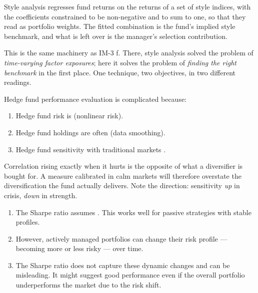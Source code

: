 Style analysis regresses fund returns on the returns of a set of 
style indices, with the coefficients constrained to be non-negative and to sum to
one, so that they read as portfolio weights. The fitted combination is the fund's
implied style benchmark, and what is left over is the manager's selection
contribution.

\begin{imkeybox}
This is the same machinery as IM-3 f. There, style analysis solved the problem of
\emph{time-varying factor exposures}; here it solves the problem of \emph{finding
the right benchmark} in the first place. One technique, two objectives, in two
different readings.
\end{imkeybox}


Hedge fund performance evaluation is complicated because:

\begin{enumerate}
\item Hedge fund risk is  (nonlinear risk).
\item Hedge fund holdings are often  (data smoothing).
\item Hedge fund sensitivity with traditional markets .
\end{enumerate}

\begin{imtrapbox}[breakable=false,title={The third one is the dangerous one}]
Correlation rising exactly when it hurts is the opposite of what a diversifier is
bought for. A measure calibrated in calm markets will therefore overstate the
diversification the fund actually delivers. Note the direction: sensitivity
\emph{up} in crisis, \emph{down} in strength.
\end{imtrapbox}


\begin{enumerate}[label=\alph*)]
\item The Sharpe ratio assumes . This works well
for passive strategies with stable profiles.
\item However, actively managed portfolios can change their risk profile ---
becoming more or less risky --- over time.
\item The Sharpe ratio does not capture these dynamic changes and can be
misleading. It might suggest good performance even if the overall portfolio
underperforms the market due to the risk shift.
\end{enumerate}

